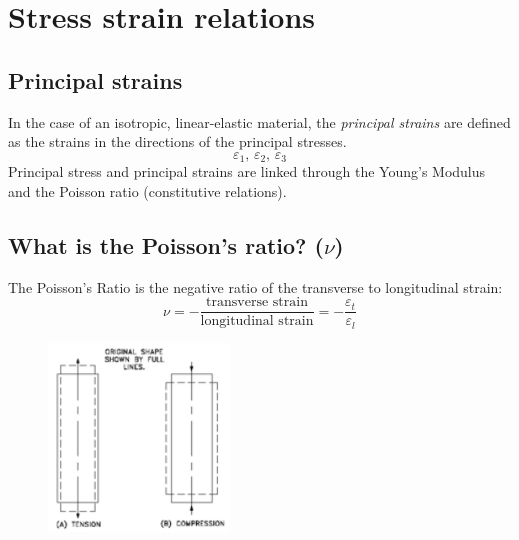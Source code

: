 \documentclass[class=report, crop=false, 12pt,a4paper]{standalone}
\begin{document}
\section{Stress strain relations}
\subsection{Principal strains}
In the case of an isotropic, linear-elastic material, the \textit{principal strains} are defined as the strains in the directions of the principal stresses.
\begin{equation}
    \varepsilon_1, \, \varepsilon_2, \, \varepsilon_3
\end{equation}
Principal stress and principal strains are linked through the Young's Modulus and the Poisson ratio (constitutive relations).
\subsection{What is the Poisson's ratio? ($\nu$)}
The Poisson's Ratio is the negative ratio of the transverse to longitudinal strain:
\begin{equation}
    \nu = -\frac{\textrm{transverse strain}}{\textrm{longitudinal strain}} = - \frac{\varepsilon_t}{\varepsilon_l}
\end{equation}
\begin{figure}[H]
    \centering
    \includegraphics[height = 5cm]{../img/diagram67.png}
    \caption{}
\end{figure}
\end{document}
